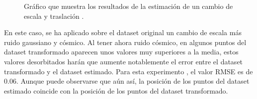\begin{figure}[H]
\begin{center}
\hspace{0.5cm}

\end{center}

\caption{Gráfico que muestra los resultados de la estimación de un cambio de escala y traslación .}
\end{figure}

En este caso, se ha aplicado sobre el dataset original un cambio de escala más ruido gaussiano y cósmico. Al tener ahora ruido cósmico, en algunos puntos del dataset transformado aparecen unos valores muy superiores a la media, estos valores desorbitados harán que aumente notablemente el error entre el dataset transformado y el dataset estimado. Para esta experimento , el valor RMSE es de 0.06. Aunque puede observarse que aún así, la posición de los puntos del dataset estimado coincide con la posición de los puntos del dataset transformado.

